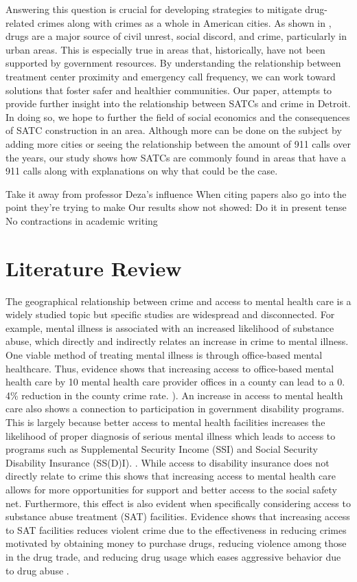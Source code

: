 \documentclass[12pt]{article}
\begin{document}
Answering this question is crucial for developing strategies to mitigate drug-related crimes along with crimes as a whole in American cities. As shown in \cite{SAT_centers_and_crime}, drugs are a major source of civil unrest, social discord, and crime, particularly in urban areas. This is especially true in areas that, historically, have not been supported by government resources. By understanding the relationship between treatment center proximity and emergency call frequency, we can work toward solutions that foster safer and healthier communities. Our paper, attempts to provide further insight into the relationship between SATCs and crime in Detroit. In doing so, we hope to further the field of social economics and the consequences of SATC construction in an area. Although more can be done on the subject by adding more cities or seeing the relationship between the amount of 911 calls over the years, our study shows how SATCs are commonly found in areas that have a 911 calls along with explanations on why that could be the case.

Take it away from professor Deza's influence
When citing papers also go into the point they're trying to make
Our results show not showed: Do it in present tense
No contractions in academic writing


\section{Literature Review} \label{sec:literature}
    The geographical relationship between crime and access to mental health care is a widely studied topic but specific studies are widespread and disconnected. For example, mental illness is associated with an increased likelihood of substance abuse, which directly and indirectly relates an increase in crime to mental illness. One viable method of treating mental illness is through office-based mental healthcare. Thus, evidence shows that increasing access to office-based mental health care by 10 mental health care provider offices in a county can lead to a 0. 4\% reduction in the county crime rate. \cite{mental_healthcare_and_crime}). An increase in access to mental health care also shows a connection to participation in government disability programs. This is largely because better access to mental health facilities increases the likelihood of proper diagnosis of serious mental illness which leads to access to programs such as Supplemental Security Income (SSI) and Social Security Disability Insurance (SS(D)I). \cite{mental_health_and_disability}. While access to disability insurance does not directly relate to crime this shows that increasing access to mental health care allows for more opportunities for support and better access to the social safety net. Furthermore, this effect is also evident when specifically considering access to substance abuse treatment (SAT) facilities. Evidence shows that increasing access to SAT facilities reduces violent crime due to the effectiveness in reducing crimes motivated by obtaining money to purchase drugs, reducing violence among those in the drug trade, and reducing drug usage which eases aggressive behavior due to drug abuse \cite{SAT_centers_and_crime}. 
\end{document}
